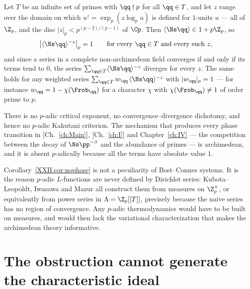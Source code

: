 \begin{theorem}\label{XXII:thm:noabscissa}
Let $T$ be an infinite set of primes with $\qq\nmid p$ for all $\qq\in T$, and let
$z$ range over the domain on which $u^z=\exp_p(z\log_pu)$ is defined for $1$-units $u$ ---
all of $\Z_p$, and the disc $|z|_p<p^{(p-2)/(p-1)}$ of $\Cp$. Then
$\langle\Ns\qq\rangle\in1+p\Z_p$, so
\[
\bigl|\langle\Ns\qq\rangle^{-z}\bigr|_p=1\qquad\text{for every }\qq\in T\text{ and every such }z,
\]
and since a series in a complete non-archimedean field converges if and only if its terms
tend to $0$, the series $\sum_{\qq\in T}\langle\Ns\qq\rangle^{-z}$ diverges for every $z$.
The same holds for any weighted series
$\sum_{\qq\in T}w_\qq\,\langle\Ns\qq\rangle^{-z}$ with $|w_\qq|_p=1$ --- for instance
$w_\qq=1-\chi(\Frob_\qq)$ for a character $\chi$ with $\chi(\Frob_\qq)\ne1$ of order prime
to $p$.
\end{theorem}

\begin{corollary}\label{XXII:cor:nophase}
There is no $p$-adic critical exponent, no convergence--divergence dichotomy, and hence no
$p$-adic Kakutani criterion. The mechanism that produces every phase transition in
[Ch.~\ref{ch:Main}], [Ch.~\ref{ch:I}] and Chapter~\ref{ch:IV} --- the competition between the decay of
$\Ns\pp^{-\beta}$ and the abundance of primes --- is archimedean, and it is absent
$p$-adically because all the terms have absolute value $1$.
\end{corollary}

\begin{remark}\label{XXII:rem:whymeasures}
Corollary~\ref{XXII:cor:nophase} is not a peculiarity of Bost--Connes systems. It is the reason
$p$-adic $L$-functions are never defined by Dirichlet series: Kubota--Leopoldt, Iwasawa
\cite{Iwasawa} and
Mazur all construct them from measures on $\Z_p^\times$, or equivalently from power series in
$\Lambda=\Z_p[[T]]$, precisely because the naive series has no region of convergence. Any
$p$-adic thermodynamics would have to be built on measures, and would then lack the
variational characterization that makes the archimedean theory informative.
\end{remark}

\section{The obstruction cannot generate the characteristic ideal}

